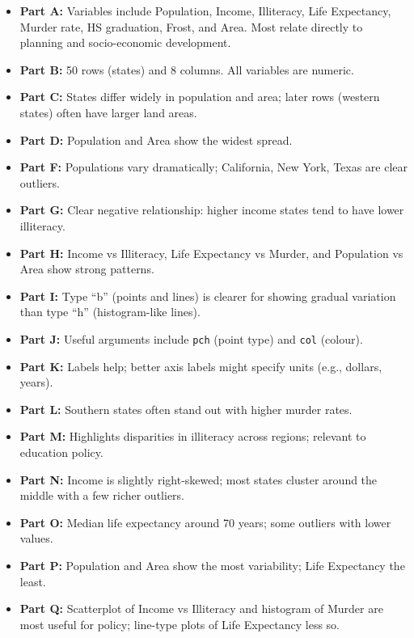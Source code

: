\documentclass[
  letterpaper,
  DIV=11,
  numbers=noendperiod]{scrreprt}
\providecommand{\tightlist}{%
  \setlength{\itemsep}{0pt}\setlength{\parskip}{0pt}}
\begin{document}
\begin{itemize}
\tightlist
\item
  \textbf{Part A:} Variables include Population, Income, Illiteracy,
  Life Expectancy, Murder rate, HS graduation, Frost, and Area. Most
  relate directly to planning and socio-economic development.
\item
  \textbf{Part B:} 50 rows (states) and 8 columns. All variables are
  numeric.
\item
  \textbf{Part C:} States differ widely in population and area; later
  rows (western states) often have larger land areas.
\item
  \textbf{Part D:} Population and Area show the widest spread.
\item
  \textbf{Part F:} Populations vary dramatically; California, New York,
  Texas are clear outliers.
\item
  \textbf{Part G:} Clear negative relationship: higher income states
  tend to have lower illiteracy.
\item
  \textbf{Part H:} Income vs Illiteracy, Life Expectancy vs Murder, and
  Population vs Area show strong patterns.
\item
  \textbf{Part I:} Type ``b'' (points and lines) is clearer for showing
  gradual variation than type ``h'' (histogram-like lines).
\item
  \textbf{Part J:} Useful arguments include \texttt{pch} (point type)
  and \texttt{col} (colour).
\item
  \textbf{Part K:} Labels help; better axis labels might specify units
  (e.g., dollars, years).
\item
  \textbf{Part L:} Southern states often stand out with higher murder
  rates.
\item
  \textbf{Part M:} Highlights disparities in illiteracy across regions;
  relevant to education policy.
\item
  \textbf{Part N:} Income is slightly right-skewed; most states cluster
  around the middle with a few richer outliers.
\item
  \textbf{Part O:} Median life expectancy around 70 years; some outliers
  with lower values.
\item
  \textbf{Part P:} Population and Area show the most variability; Life
  Expectancy the least.
\item
  \textbf{Part Q:} Scatterplot of Income vs Illiteracy and histogram of
  Murder are most useful for policy; line-type plots of Life Expectancy
  less so.
\end{itemize}
\end{document}
